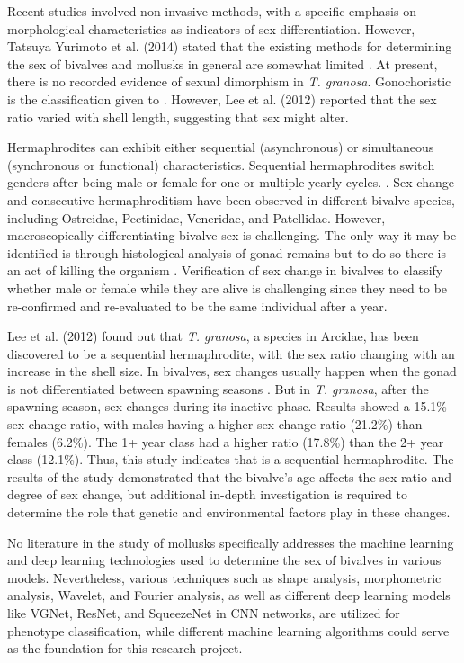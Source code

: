 {Recent studies involved non-invasive methods, with a specific emphasis on morphological characteristics as indicators of sex differentiation. However, Tatsuya Yurimoto et al. (2014) stated that the existing methods for determining the sex of bivalves and mollusks in general are somewhat limited \cite{afiati2007}. At present, there is no recorded evidence of sexual dimorphism in \textit{T. granosa}. Gonochoristic is the classification given to \Tgranosa \cite{lee1997}. However, Lee et al. (2012) reported that the sex ratio varied with shell length, suggesting that sex might alter. 

Hermaphrodites can exhibit either sequential (asynchronous) or simultaneous (synchronous or functional) characteristics. Sequential hermaphrodites switch genders after being male or female for one or multiple yearly cycles. \cite{heller1993, gosling2004, collin2013}. Sex change and consecutive hermaphroditism have been observed in different bivalve species, including Ostreidae, Pectinidae, Veneridae, and Patellidae. However, macroscopically differentiating bivalve sex is challenging. The only way it may be identified is through histological analysis of gonad remains but to do so there is an act of killing the organism \cite{coe1943, gosling2004}. Verification of sex change in bivalves to classify whether male or female while they are alive is challenging since they need to be re-confirmed and re-evaluated to be the same individual after a year.

Lee et al. (2012) found out that \textit{T. granosa}, a species in Arcidae, has been discovered to be a sequential hermaphrodite, with the sex ratio changing with an increase in the shell size. In bivalves, sex changes usually happen when the gonad is not differentiated between spawning seasons \cite{thompson1996}. But in \textit{T. granosa}, after the spawning season, sex changes during its inactive phase. Results showed a 15.1\% sex change ratio, with males having a higher sex change ratio (21.2\%) than females (6.2\%). The 1+ year class had a higher ratio (17.8\%) than the 2+ year class (12.1\%). Thus, this study indicates that \Tgranosa is a sequential hermaphrodite. The results of the study demonstrated that the bivalve's age affects the sex ratio and degree of sex change, but additional in-depth investigation is required to determine the role that genetic and environmental factors play in these changes.

No literature in the study of mollusks specifically addresses the machine learning and deep learning technologies used to determine the sex of \Tgranosa bivalves in various models. Nevertheless, various techniques such as shape analysis, morphometric analysis, Wavelet, and Fourier analysis, as well as different deep learning models like VGNet, ResNet, and SqueezeNet in CNN networks, are utilized for phenotype classification, while different machine learning algorithms could serve as the foundation for this research project. 

}

